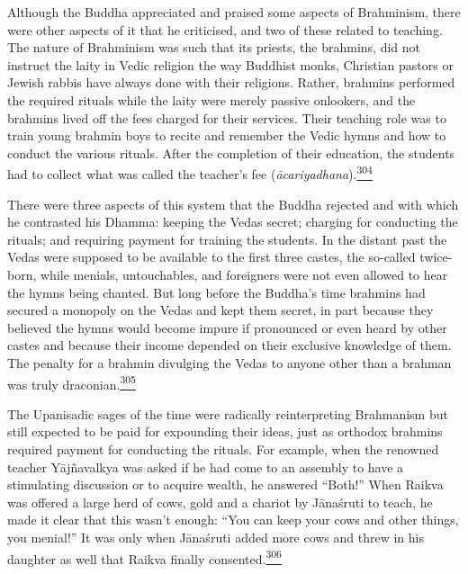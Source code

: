 Although the Buddha appreciated and praised some aspects of Brahminism,
there were other aspects of it that he criticised, and two of these
related to teaching. The nature of Brahminism was such that its priests,
the brahmins, did not instruct the laity in Vedic religion the way
Buddhist monks, Christian pastors or Jewish rabbis have always done with
their religions. Rather, brahmins performed the required rituals while
the laity were merely passive onlookers, and the brahmins lived off the
fees charged for their services. Their teaching role was to train young
brahmin boys to recite and remember the Vedic hymns and how to conduct
the various rituals. After the completion of their education, the
students had to collect what was called the teacher's fee
(\emph{ācariyadhana}).\label{footprints_split_010.html_fnref304}\hyperref[footprints_split_024.htmlux5cux23fn304]{\textsuperscript{304}}

There were three aspects of this system that the Buddha rejected and
with which he contrasted his Dhamma: keeping the Vedas secret; charging
for conducting the rituals; and requiring payment for training the
students. In the distant past the Vedas were supposed to be available to
the first three castes, the so-called twice-born, while menials,
untouchables, and foreigners were not even allowed to hear the hymns
being chanted. But long before the Buddha's time brahmins had secured a
monopoly on the Vedas and kept them secret, in part because they
believed the hymns would become impure if pronounced or even heard by
other castes and because their income depended on their exclusive
knowledge of them. The penalty for a brahmin divulging the Vedas to
anyone other than a brahman was truly
draconian.\label{footprints_split_010.html_fnref305}\hyperref[footprints_split_024.htmlux5cux23fn305]{\textsuperscript{305}}

The Upanisadic sages of the time were radically reinterpreting
Brahmanism but still expected to be paid for expounding their ideas,
just as orthodox brahmins required payment for conducting the rituals.
For example, when the renowned teacher Yājñavalkya was asked if he had
come to an assembly to have a stimulating discussion or to acquire
wealth, he answered ``Both!'' When Raikva was offered a large herd of
cows, gold and a chariot by Jānaśruti to teach, he made it clear that
this wasn't enough: ``You can keep your cows and other things, you
menial!'' It was only when Jānaśruti added more cows and threw in his
daughter as well that Raikva finally
consented.\label{footprints_split_010.html_fnref306}\hyperref[footprints_split_024.htmlux5cux23fn306]{\textsuperscript{306}}


